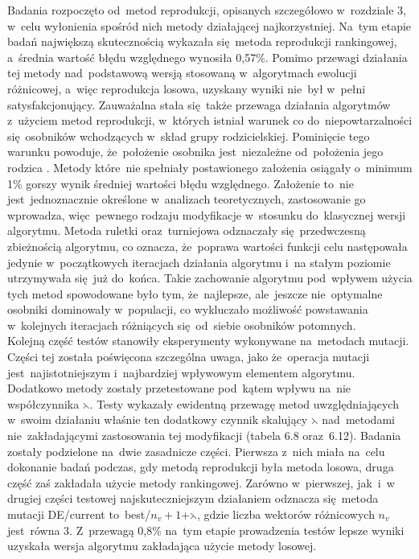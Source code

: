 Badania rozpoczęto od~metod reprodukcji, opisanych szczegółowo w~rozdziale 3, w~celu wyłonienia spośród nich metody działającej najkorzystniej. Na~tym etapie badań największą skutecznością wykazała się~metoda reprodukcji rankingowej, a~średnia wartość błędu względnego wynosiła 0,57\%. Pomimo przewagi działania tej metody nad~podstawową wersją stosowaną w~algorytmach ewolucji różnicowej, a~więc reprodukcja losowa, uzyskany wyniki nie~był w~pełni satysfakcjonujący. Zauważalna stała się~także przewaga działania algorytmów z~użyciem metod reprodukcji, w~których istniał warunek co do~niepowtarzalności się~osobników wchodzących w~skład grupy rodzicielskiej. Pominięcie tego warunku powoduje, że~położenie osobnika jest~niezależne od~położenia jego
rodzica \cite{diff2}. Metody które~nie spełniały postawionego założenia osiągały o~minimum 1\% gorszy wynik średniej wartości błędu względnego. Założenie to~nie jest~jednoznacznie określone w~analizach teoretycznych, zastosowanie go wprowadza, więc~pewnego rodzaju modyfikacje w~stosunku do~klasycznej wersji algorytmu. Metoda ruletki oraz~turniejowa odznaczały się~przedwczesną zbieżnością algorytmu, co oznacza, że~poprawa wartości funkcji celu następowała jedynie w~początkowych iteracjach działania algorytmu i~na stałym poziomie utrzymywała się~już do~końca. Takie zachowanie algorytmu pod~wpływem użycia tych metod spowodowane było tym, że~najlepsze, ale~jeszcze nie~optymalne osobniki dominowały w~populacji, co wykluczało możliwość powstawania w~kolejnych iteracjach różniących się~od~siebie osobników potomnych.\\

Kolejną część testów stanowiły eksperymenty wykonywane na~metodach mutacji. Części tej została poświęcona szczególna uwaga, jako że~operacja mutacji jest~najistotniejszym i~najbardziej wpływowym elementem algorytmu. Dodatkowo metody zostały przetestowane pod~kątem wpływu na~nie współczynnika $\leftthreetimes$. Testy wykazały ewidentną przewagę metod uwzględniających w~swoim działaniu właśnie ten dodatkowy czynnik skalujący $\leftthreetimes$ nad~metodami nie~zakładającymi zastosowania tej modyfikacji (tabela 6.8 oraz~6.12). Badania zostały podzielone na~dwie zasadnicze części. Pierwsza z~nich miała na~celu dokonanie badań podczas, gdy metodą reprodukcji była metoda losowa, druga część zaś zakładała użycie metody rankingowej. Zarówno w~pierwszej, jak~i~w drugiej części testowej najskuteczniejszym działaniem odznacza się~metoda mutacji DE/current to~best/$n_{v}+1$+$\leftthreetimes$, gdzie liczba wektorów różnicowych $n_{v}$ jest~równa 3. Z~przewagą 0,8\% na~tym etapie prowadzenia testów lepsze wyniki uzyskała wersja algorytmu zakładająca użycie metody losowej.\\

